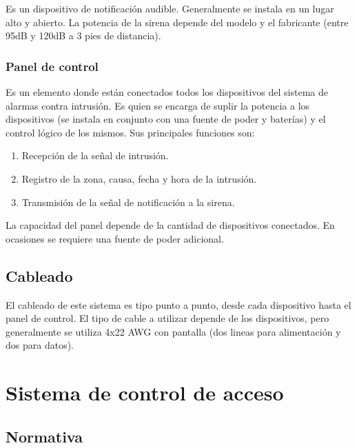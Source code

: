 Es un dispositivo de notificación audible. Generalmente se instala en un lugar alto y abierto. La potencia de la sirena depende del modelo y el fabricante (entre 95dB y 120dB a 3 pies de distancia). \cite{Sirena}


\subsubsection{Panel de control}

Es un elemento donde están conectados todos los dispositivos del sistema de alarmas contra intrusión. Es quien se encarga de suplir la potencia a los dispositivos (se instala en conjunto con una fuente de poder y baterías) y el control lógico de los mismos. Sus principales funciones son: \cite{Robo}

\begin{enumerate}
	
	\item Recepción de la señal de intrusión.
	
	\item Registro de la zona, causa, fecha y hora de la intrusión.
	
	\item Transmisión de la señal de notificación a la sirena.
	
\end{enumerate}

La capacidad del panel depende de la cantidad de dispositivos conectados. En ocasiones se requiere una fuente de poder adicional. 


\subsection{Cableado}

El cableado de este sistema es tipo punto a punto, desde cada dispositivo hasta el panel de control. El tipo de cable a utilizar depende de los dispositivos, pero generalmente se utiliza 4x22 AWG con pantalla (dos lineas para alimentación y dos para datos). \cite{Teclado}








\newpage


\section{Sistema de control de acceso}

\subsection{Normativa}

